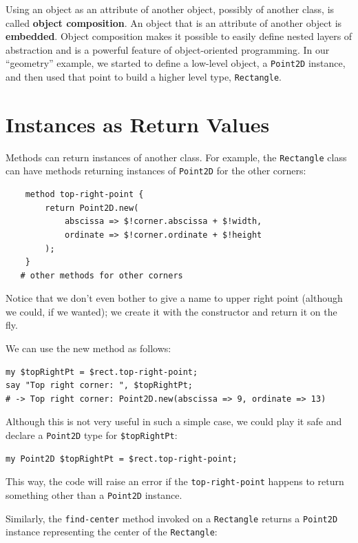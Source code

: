 Using an object as an attribute of another object, possibly 
of another class, is called {\bf object composition}. An object 
that is an attribute of another object is {\bf embedded}. Object 
composition makes it possible to easily define nested layers of 
abstraction and is a powerful feature of object-oriented 
programming. In our ``geometry'' example, we started to define 
a low-level object, a {\tt Point2D} instance, and then used 
that point to build a higher level type, {\tt Rectangle}.


\section{Instances as Return Values}

Methods can return instances of another class.  For example, 
the {\tt Rectangle} class can have methods returning 
instances of {\tt Point2D} for the other corners:

\begin{verbatim}
    method top-right-point {
        return Point2D.new(
            abscissa => $!corner.abscissa + $!width, 
            ordinate => $!corner.ordinate + $!height
        );
    }
   # other methods for other corners
\end{verbatim}

Notice that we don't even bother to give a name to upper right 
point (although we could, if we wanted); we create it with the 
constructor and return it on the fly.

We can use the new method as follows:

\begin{verbatim}
my $topRightPt = $rect.top-right-point;
say "Top right corner: ", $topRightPt;
# -> Top right corner: Point2D.new(abscissa => 9, ordinate => 13)
\end{verbatim}

Although this is not very useful in such a simple case, we 
could play it safe and declare a {\tt Point2D} type for 
\verb'$topRightPt':

\begin{verbatim}
my Point2D $topRightPt = $rect.top-right-point;
\end{verbatim} 

This way, the code will raise an error if the {\tt top-right-point} 
happens to return something other than a {\tt Point2D} instance.

Similarly, the \verb"find-center" method invoked on a 
{\tt Rectangle} returns a {\tt Point2D} instance 
representing the center of the {\tt Rectangle}:

